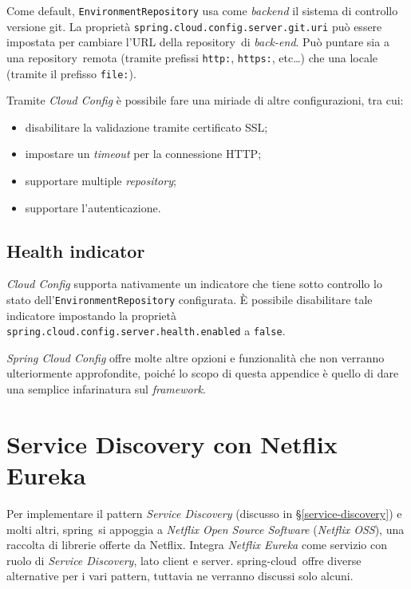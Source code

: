 Come default, \texttt{EnvironmentRepository} usa come \textit{backend} il sistema di controllo versione \gls{git}\gloss.
La proprietà \texttt{spring.cloud.config.server.git.uri} può essere impostata per cambiare l'URL della \gls{repository}\gloss\ di \textit{back-end}.
Può puntare sia a una \gls{repository}\gloss\ remota (tramite prefissi \texttt{http:}, \texttt{https:}, etc\dots) che una locale (tramite il prefisso \texttt{file:}).

Tramite \textit{Cloud Config} è possibile fare una miriade di altre configurazioni, tra cui:

\begin{itemize}
	\item disabilitare la validazione tramite certificato SSL;
	\item impostare un \textit{timeout} per la connessione HTTP;
	\item supportare multiple \textit{repository};
	\item supportare l'autenticazione.
\end{itemize}

\subsection{Health indicator} \textit{Cloud Config} supporta nativamente un indicatore che
tiene sotto controllo lo stato dell'\texttt{EnvironmentRepository} configurata.
È possibile disabilitare tale indicatore impostando la proprietà \texttt{spring.cloud.config.server.health.enabled} a \texttt{false}.

\bigskip

\textit{Spring Cloud Config} offre molte altre opzioni e funzionalità che non verranno ulteriormente approfondite, poiché lo scopo di questa appendice è quello di dare una semplice infarinatura sul \textit{framework}.


\section{Service Discovery con Netflix Eureka}

Per implementare il pattern \textit{Service Discovery} (discusso in \S\ref{service-discovery}) e molti altri, \gls{spring}\gloss\ si appoggia a \textit{Netflix Open Source Software} (\textit{Netflix OSS}), una raccolta di librerie offerte da Netflix.
Integra \textit{Netflix Eureka} come servizio con ruolo di \textit{Service Discovery}, lato client e server. \gls{spring-cloud}\gloss\ offre diverse alternative per i vari pattern, tuttavia ne verranno discussi solo alcuni.


